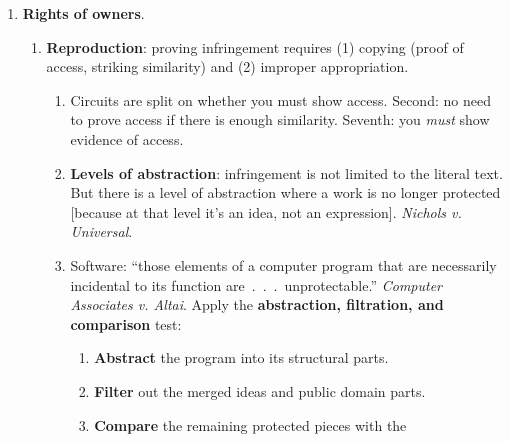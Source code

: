 \begin{enumerate}
\begin{enumerate}
\begin{enumerate}
\begin{enumerate}
                copyright interests that they had licensed. (But most 
                licensees insisted on advance assignment.)
                \item 1976 Act: eliminated the renewal requirement. Copyright 
                holders could terminate transfers of copyright between the 
                thirty-fifth and fortieth year from the execution of the 
                transfer.  Congress wanted to give stronger rights to authors 
                and their families.  This violates freedom of contract, but it 
                compensates for publishers' ``unequal bargaining 
                power.''\footnote{Casebook p. 533.}
            \end{enumerate}
        \end{enumerate}
    \end{enumerate}
    \item \textbf{Rights of owners}.
    \begin{enumerate}
        \item \textbf{Reproduction}: proving infringement requires (1) copying 
        (proof of access, striking similarity) and (2) improper appropriation.
        \begin{enumerate}
            \item Circuits are split on whether you must show access. Second: 
            no need to prove access if there is enough similarity. Seventh: 
            you \emph{must} show evidence of access.
            \item \textbf{Levels of abstraction}: infringement is not limited 
            to the literal text. But there is a level of abstraction where a 
            work is no longer protected [because at that level it's an idea, 
            not an expression]. \emph{Nichols v. Universal}.
            \item Software: ``those elements of a computer program that are 
            necessarily incidental to its function are~.~.~.~unprotectable.'' 
            \emph{Computer Associates v. Altai}. Apply the 
            \textbf{abstraction, filtration, and comparison} test:
            \begin{enumerate}
                \item \textbf{Abstract} the program into its structural parts.
                \item \textbf{Filter} out the merged ideas and public domain 
                parts.
                \item \textbf{Compare} the remaining protected pieces with the 

\end{enumerate}
\end{enumerate}
\end{enumerate}
\end{enumerate}
